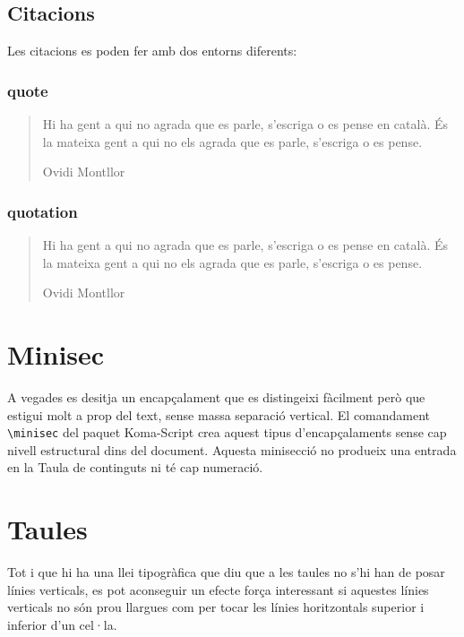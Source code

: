 \documentclass[a4paper,%
                             twoside,%
                             BCOR1.0cm,%
                             DIV11,%
                             parskip=full,%
                             11pt]{scrbook}
\begin{document}
\subsection{Citacions}\label{sbsec:citacio}
Les citacions es poden fer amb dos entorns diferents:
\subsubsection{quote}\label{sbsec:quote}

\begin{quote}
Hi ha gent a qui no agrada que es parle, s’escriga o es pense en català. És la mateixa gent a qui no els agrada que es parle, s’escriga o es pense.

Ovidi Montllor
\end{quote}

\subsubsection{quotation}\label{sbsec:quotation}
\begin{quotation}
Hi ha gent a qui no agrada que es parle, s’escriga o es pense en català. És la mateixa gent a qui no els agrada que es parle, s’escriga o es pense.

Ovidi Montllor
\end{quotation}

\section{Minisec}\label{sec:minisec}
A vegades es desitja un encapçalament que es distingeixi fàcilment però que estigui molt a prop del text, sense massa separació vertical. El comandament \verb+\minisec+ del paquet Koma-Script crea  aquest tipus d'encapçalaments sense cap nivell estructural dins del document. Aquesta minisecció no produeix una entrada en la Taula de continguts ni té cap numeració. 

\lipsum[1-2]

\section{Taules}\label{sec:taules}

Tot i que hi ha una llei tipogràfica que diu que a les taules no s'hi han de posar línies verticals, es pot aconseguir un efecte força interessant si aquestes línies verticals no són prou llargues com per tocar les línies horitzontals superior i inferior d'un cel·la. 
\end{document}
